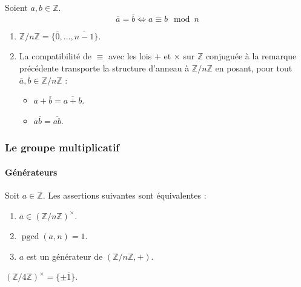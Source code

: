   \begin{remark}
    Soient $a, b \in \mathbb{Z}$.
    \[ \overline{a} = \overline{b} \iff a \equiv b \mod n \]
  \end{remark}

  \begin{proposition}
    \begin{enumerate}[label={\bfseries(\roman*)}]
      \item $\mathbb{Z}/n\mathbb{Z} = \{ \overline{0}, \dots, \overline{n-1} \}$.
      \item La compatibilité de $\equiv$ avec les lois $+$ et $\times$ sur $\mathbb{Z}$ conjuguée à la remarque précédente transporte la structure d'anneau à $\mathbb{Z}/n\mathbb{Z}$ en posant, pour tout $\overline{a}, \overline{b} \in \mathbb{Z}/n\mathbb{Z}$ :
      \begin{itemize}
        \item $\overline{a} + \overline{b} = \overline{a+b}$.
        \item $\overline{a} \overline{b} = \overline{ab}$.
      \end{itemize}
    \end{enumerate}
  \end{proposition}

  \subsubsection{Le groupe multiplicatif}

  \paragraph{Générateurs}


  \begin{theorem}
    \label{120-2}
    Soit $a \in \mathbb{Z}$. Les assertions suivantes sont équivalentes :
    \begin{enumerate}[label={\bfseries(\roman*)}]
      \item $\overline{a} \in (\mathbb{Z}/n\mathbb{Z})^\times$.
      \item $\operatorname{pgcd}(a,n)=1$.
      \item $a$ est un générateur de $(\mathbb{Z}/n\mathbb{Z}, +)$.
    \end{enumerate}
  \end{theorem}


  \begin{example}
    \label{120-3}
    $(\mathbb{Z}/4\mathbb{Z})^\times = \{ \pm \overline{1} \}$.
  \end{example}

